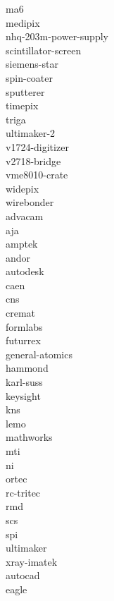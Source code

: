 \documentclass[../main.tex]{subfiles}%
\begin{document}
\gls{ma6}\\%
\gls{medipix}\\%
\gls{nhq-203m-power-supply}\\%
\gls{scintillator-screen}\\%
\gls{siemens-star}\\%
\gls{spin-coater}\\%
\gls{sputterer}\\%
\gls{timepix}\\%
\gls{triga}\\%
\gls{ultimaker-2}\\%
\gls{v1724-digitizer}\\%
\gls{v2718-bridge}\\%
\gls{vme8010-crate}\\%
\gls{widepix}\\%
\gls{wirebonder}\\%
\gls{advacam}\\%
\gls{aja}\\%
\gls{amptek}\\%
\gls{andor}\\%
\gls{autodesk}\\%
\gls{caen}\\%
\gls{cns}\\%
\gls{cremat}\\%
\gls{formlabs}\\%
\gls{futurrex}\\%
\gls{general-atomics}\\%
\gls{hammond}\\%
\gls{karl-suss}\\%
\gls{keysight}\\%
\gls{kns}\\%
\gls{lemo}\\%
\gls{mathworks}\\%
\gls{mti}\\%
\gls{ni}\\%
\gls{ortec}\\%
\gls{rc-tritec}\\%
\gls{rmd}\\%
\gls{scs}\\%
\gls{spi}\\%
\gls{ultimaker}\\%
\gls{xray-imatek}\\%
\gls{autocad}\\%
\gls{eagle}\\%
\end{document}
